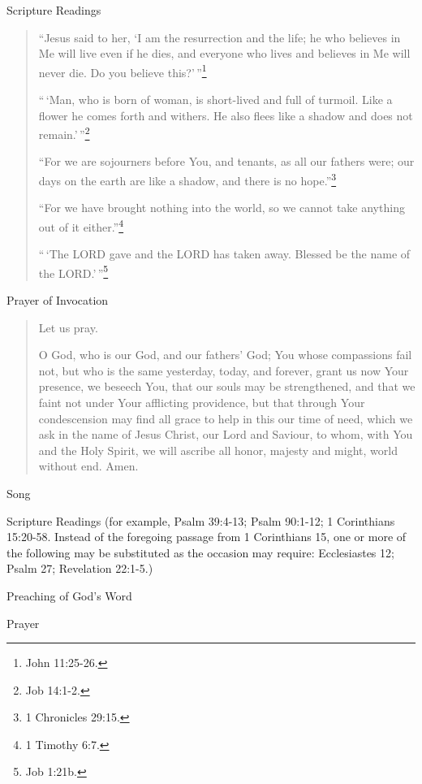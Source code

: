\documentclass[
]{book}
\begin{document}
Scripture Readings

\begin{quote}
``Jesus said to her, `I am the resurrection and the life; he who believes in Me will live even if he dies, and everyone who lives and believes in Me will never die. Do you believe this?'\,''\footnote{John 11:25-26.}

``\,`Man, who is born of woman, is short-lived and full of turmoil. Like a flower he comes forth and withers. He also flees like a shadow and does not remain.'\,''\footnote{Job 14:1-2.}

``For we are sojourners before You, and tenants, as all our fathers were; our days on the earth are like a shadow, and there is no hope.''\footnote{1 Chronicles 29:15.}

``For we have brought nothing into the world, so we cannot take anything out of it either.''\footnote{1 Timothy 6:7.}

``\,`The LORD gave and the LORD has taken away. Blessed be the name of the LORD.'\,''\footnote{Job 1:21b.}
\end{quote}

Prayer of Invocation

\begin{quote}
Let us pray.

O God, who is our God, and our fathers' God; You whose compassions fail not, but who is the same yesterday, today, and forever, grant us now Your presence, we beseech You, that our souls may be strengthened, and that we faint not under Your afflicting providence, but that through Your condescension may find all grace to help in this our time of need, which we ask in the name of Jesus Christ, our Lord and Saviour, to whom, with You and the Holy Spirit, we will ascribe all honor, majesty and might, world without end. Amen.
\end{quote}

Song

Scripture Readings (for example, Psalm 39:4-13; Psalm 90:1-12; 1 Corinthians 15:20-58. Instead of the foregoing passage from 1 Corinthians 15, one or more of the following may be substituted as the occasion may require: Ecclesiastes 12; Psalm 27; Revelation 22:1-5.)

Preaching of God's Word

Prayer
\end{document}
